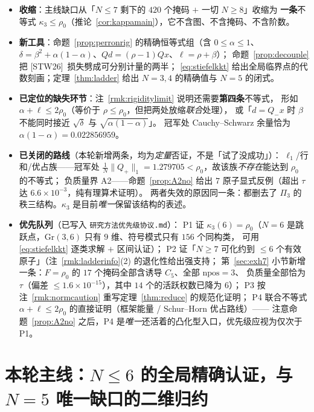 \documentclass[UTF8,11pt]{ctexart}
\theoremstyle{definition}
\newcommand{\STW}{\textup{[STW26]}}
\begin{document}
\begin{itemize}[leftmargin=1.6em,itemsep=1pt]
\item \textbf{收缩}：主线缺口从「$N\le7$ 剩下的 $420$ 个掩码 $+$ 一切 $N\ge8$」收缩为
\textbf{一条}不等式 $\kappa_3\le\rho_0$（推论~\ref{cor:kappamain}），它不含图、不含掩码、不含阶数。
\item \textbf{新工具}：命题~\ref{prop:perronrig} 的精确恒等式组（含 $0\le\alpha\le1$、
$\delta=\beta^2+\alpha(1-\alpha)$、$Qd=(\rho-1)Qx$、$\ell=\rho+\beta$）；
命题~\ref{prop:decouple} 把 \STW\ 损失劈成可分别计量的两半；
\eqref{eq:stiefelkkt} 给出全局临界点的代数刻画；定理~\ref{thm:ladder} 给出 $N=3,4$ 的精确值与 $N=5$ 的闭式。
\item \textbf{已定位的缺失环节}：注~\ref{rmk:rigiditylimit} 说明还需要\textbf{第四条}不等式，
形如 $\alpha+\ell\le2\rho_0$（等价于 $\rho\le\rho_0$，但把两处放缩\emph{联合}处理），
或「$d=Q_-x$ 时 $\beta$ 不能同时接近 $\sqrt\delta$ 与 $\sqrt{\alpha(1-\alpha)}$」。
冠军处 Cauchy--Schwarz 余量恰为 $\alpha(1-\alpha)=0.022856959$。
\item \textbf{已关闭的路线}（本轮新增两条，均为\emph{定量}否证，不是「试了没成功」）：
$\ell_1$/行和/优占族——冠军处 $\frac1N\|Q_+\|_1=1.279705<\rho_0$，故该族\emph{不存在}能达到 $\rho_0$ 的不等式；
负质量界 A2——命题~\ref{prop:A2no} 给出 $7$ 原子显式反例（超出 $\tau$ 达 $6.6\times10^{-3}$，纯有理算术证明）。
两者失效的原因同一条：都删去了 $\Pi_3$ 的秩三结构。$\kappa_3$ 是目前\emph{唯一}保留该结构的表述。
\item \textbf{优先队列}（已写入 \texttt{研究方法优先级协议.md}）：
P1 证 $\kappa_3(6)=\rho_0$（$N=6$ 是跳跃点，$\mathrm{Gr}(3,6)$ 只有 $9$ 维、符号模式只有 $156$ 个同构类，
可用 \eqref{eq:stiefelkkt} 逐类求解 $+$ 区间认证）；
P2 证「$N\ge7$ 可化约到 $\le6$ 个有效原子」（注~\ref{rmk:ladderinfo}(2) 的退化性给出强支持；
第~\ref{sec:exh7} 小节新增一条：$F=\rho_0$ 的 $17$ 个掩码全部含诱导 $C_5$、全部 $\mathrm{npos}=3$、
负质量全部恰为 $\tau$（偏差 $\le1.6\times10^{-15}$），其中 $14$ 个的活跃权数已降为 $6$）；
P3 按注~\ref{rmk:normcaution} 重写定理~\ref{thm:reduce} 的规范化证明；
P4 联合不等式 $\alpha+\ell\le2\rho_0$ 的直接证明（框架能量 / Schur--Horn 优占路线）——
注意命题~\ref{prop:A2no} 之后，P4 是\emph{唯一}还活着的凸化型入口，优先级应视为仅次于 P1。
\end{itemize}

\section{本轮主线：$N\le6$ 的全局精确认证，与 $N=5$ 唯一缺口的二维归约}\label{sec:n6global}
\end{document}
